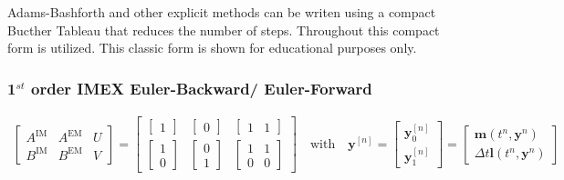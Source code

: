 \begin{notebox}
Adams-Bashforth and other explicit methods can be writen using a
compact Bucther Tableau that reduces the number of steps. Throughout
{\nek} this compact form is utilized. This classic form is shown for
educational purposes only.
\end{notebox}

\subsubsection{1$^{st}$ order IMEX Euler-Backward/ Euler-Forward}
\begin{align*}
\left[ \begin{array}{cc|c}
A^{\mathrm{IM}} & A^{\mathrm{EM}} & U \\
\hline
B^{\mathrm{IM}} & B^{\mathrm{EM}} & V
\end{array} \right ] =
\left[\begin{array}{cc|c}
\left [ \begin{array}{c} 1 \end{array} \right ] & \left [ \begin{array}{c} 0 \end{array} \right ] &
\left [ \begin{array}{cc} 1 & 1 \end{array} \right ] \\
\hline
\left [ \begin{array}{c} 1 \\ 0 \end{array} \right ] & \left [ \begin{array}{c} 0 \\ 1 \end{array} \right ]&
\left [ \begin{array}{cc} 1 & 1 \\ 0 & 0 \end{array} \right ]
\end{array}\right] \quad \mathrm{with}\quad
\boldsymbol{y}^{[n]}=
\left[\begin{array}{c}
\boldsymbol{y}^{[n]}_0\\
\boldsymbol{y}^{[n]}_1
\end{array}\right]=
\left[\begin{array}{c}
\boldsymbol{m}\left(t^n,\boldsymbol{y}^{n}\right)\\
\Delta t \boldsymbol{l}\left ( t^n, \boldsymbol{y}^{n}\right)
\end{array}\right]
\end{align*}

